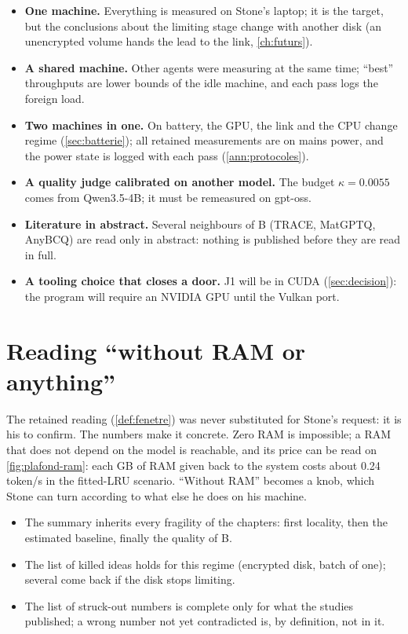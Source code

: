 \begin{itemize}
\item \textbf{One machine.} Everything is measured on Stone's laptop; it is the target, but the conclusions about the limiting stage change with another disk (an unencrypted volume hands the lead to the link, \cref{ch:futurs}).
\item \textbf{A shared machine.} Other agents were measuring at the same time; ``best'' throughputs are lower bounds of the idle machine, and each pass logs the foreign load.
\item \textbf{Two machines in one.} On battery, the GPU, the link and the CPU change regime (\cref{sec:batterie}); all retained measurements are on mains power, and the power state is logged with each pass (\cref{ann:protocoles}).
\item \textbf{A quality judge calibrated on another model.} The budget $\kappa = 0.0055$ comes from Qwen3.5-4B; it must be remeasured on gpt-oss.
\item \textbf{Literature in abstract.} Several neighbours of B (TRACE, MatGPTQ, AnyBCQ) are read only in abstract: nothing is published before they are read in full.
\item \textbf{A tooling choice that closes a door.} J1 will be in CUDA (\cref{sec:decision}): the program will require an NVIDIA GPU until the Vulkan port.
\end{itemize}

\section{Reading ``without RAM or anything''}\label{sec:lecture-discussion}

The retained reading (\cref{def:fenetre}) was never substituted for Stone's request: it is his to confirm. The numbers make it concrete. Zero RAM is impossible; a RAM that does not depend on the model is reachable, and its price can be read on \cref{fig:plafond-ram}: each GB of RAM given back to the system costs about 0.24 token/s in the fitted-LRU scenario. ``Without RAM'' becomes a knob, which Stone can turn according to what else he does on his machine.

\begin{faux}
\begin{itemize}
\item The summary inherits every fragility of the chapters: first locality, then the estimated baseline, finally the quality of B.
\item The list of killed ideas holds for this regime (encrypted disk, batch of one); several come back if the disk stops limiting.
\item The list of struck-out numbers is complete only for what the studies published; a wrong number not yet contradicted is, by definition, not in it.
\end{itemize}
\end{faux}
